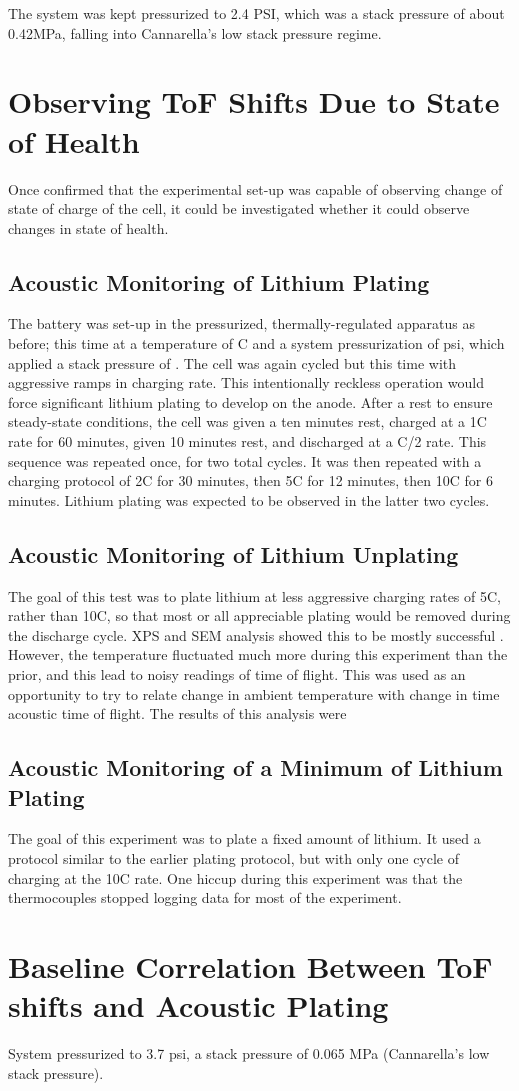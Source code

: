 The system was kept pressurized to 2.4 PSI, which was a stack pressure of about 0.42MPa, falling into Cannarella's low stack pressure regime.

\section{Observing ToF Shifts Due to State of Health} 
Once confirmed that the experimental set-up was capable of observing change of state of charge of the cell, it could be investigated whether it could observe changes in state of health.

\subsection{Acoustic Monitoring of Lithium Plating}
The battery was set-up in the pressurized, thermally-regulated apparatus as before; this time at a temperature of  C and a system pressurization of  psi, which applied a stack pressure of . 
The cell was again cycled but this time with aggressive ramps in charging rate. 
This intentionally reckless operation would force significant lithium plating to develop on the anode. 
After a rest to ensure steady-state conditions, the cell was given a ten minutes rest, charged at a 1C rate for 60 minutes, given 10 minutes rest, and discharged at a C/2 rate. 
This sequence was repeated once, for two total cycles. 
It was then repeated with a charging protocol of 2C for 30 minutes, then 5C for 12 minutes, then 10C for 6 minutes. 
Lithium plating was expected to be observed in the latter two cycles.


\subsection{Acoustic Monitoring of Lithium Unplating}
The goal of this test was to plate lithium at less aggressive charging rates of 5C, rather than 10C, so that most or all appreciable plating would be removed during the discharge cycle. XPS and SEM analysis showed this to be mostly successful . However, the temperature fluctuated much more during this experiment than the prior, and this lead to noisy readings of time of flight. This was used as an opportunity to try to relate change in ambient temperature with change in time acoustic time of flight. The results of this analysis were 


\subsection{Acoustic Monitoring of a Minimum of Lithium Plating}
The goal of this experiment was to plate a fixed amount of lithium. It used a protocol similar to the earlier plating protocol, but with only one cycle of charging at the 10C rate. One hiccup during this experiment was that the thermocouples stopped logging data for most of the experiment. 


\section{Baseline Correlation Between ToF shifts and Acoustic Plating}
System pressurized to 3.7 psi, a stack pressure of 0.065 MPa (Cannarella's low stack pressure).